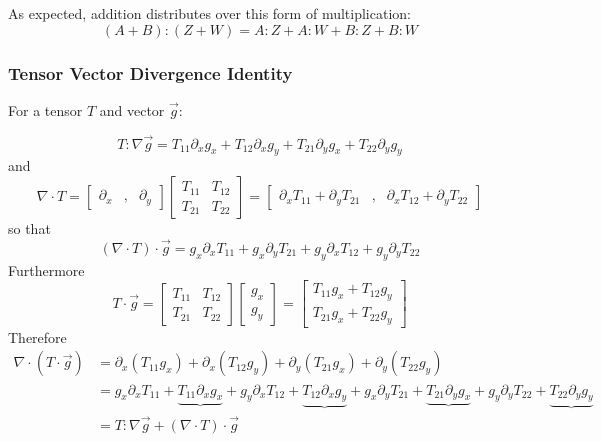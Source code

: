 \documentclass[12pt, a4paper, twoside, openright]{book}
\begin{document}
As expected, addition distributes over this form of multiplication:
\begin{equation*}
(A + B):(Z + W) = A:Z + A:W + B:Z + B:W
\end{equation*}

\subsubsection*{Tensor Vector Divergence Identity}

For a tensor $T$ and vector $\vec{g}$:

\begin{equation*}
T:\nabla \vec{g} = T_{11}\partial_x g_x + T_{12}\partial_x g_y + T_{21}\partial_y g_x
+ T_{22} \partial_y g_y
\end{equation*}
and
\begin{equation*}
\nabla \cdot T = 
\begin{bmatrix}
\partial_x & , & \partial_y
\end{bmatrix}
\begin{bmatrix}
T_{11} & T_{12} \\
T_{21} & T_{22}
\end{bmatrix} =
\begin{bmatrix}
\partial_x T_{11} + \partial_y T_{21} &,& \partial_x T_{12} + \partial_y T_{22}
\end{bmatrix}
\end{equation*}
so that
\begin{equation*}
(\nabla \cdot T) \cdot \vec{g} = 
g_x \partial_x T_{11} + g_x \partial_y T_{21} + g_y \partial_x T_{12}
 + g_y \partial_y T_{22}
\end{equation*}
 Furthermore
\begin{equation*}
T \cdot \vec{g} = 
\begin{bmatrix}
T_{11} & T_{12} \\
T_{21} & T_{22}
\end{bmatrix}
\begin{bmatrix}
g_x \\
g_y
\end{bmatrix} = 
\begin{bmatrix}
T_{11} g_x + T_{12} g_y \\
T_{21} g_x + T_{22} g_y
\end{bmatrix}
\end{equation*}
Therefore
\begin{align*}
\nabla \cdot (T \cdot \vec{g}) & = 
\partial_x (T_{11} g_x) + \partial_x (T_{12} g_y) +
\partial_y (T_{21} g_x) + \partial_y (T_{22} g_y) \\
 & = g_x \partial_x T_{11} + \underbrace{T_{11} \partial_x g_x} +
     g_y \partial_x T_{12} + \underbrace{T_{12} \partial_x g_y} +
     g_x \partial_y T_{21} + \underbrace{T_{21} \partial_y g_x} +
     g_y \partial_y T_{22} + \underbrace{T_{22} \partial_y g_y} \\
 & = T:\nabla \vec{g} + (\nabla \cdot T) \cdot \vec{g}
\end{align*}
\end{document}
